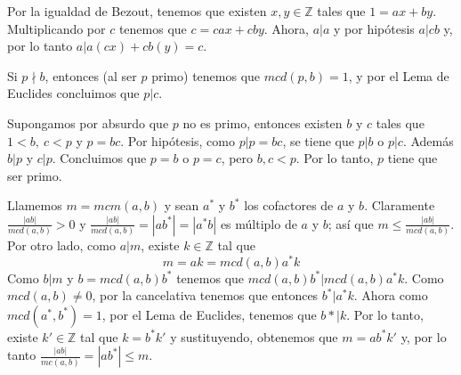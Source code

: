 \documentclass{report}
\begin{document}
\begin{myproof}
	Por la igualdad de Bezout, tenemos que existen $x,y\in\mathbb{Z}$ tales que $1=ax+by$. Multiplicando por $c$ tenemos que $c=cax+cby$. Ahora, $a|a$ y por hipótesis $a|cb$ y, por lo tanto $a|a(cx)+cb(y)=c$.
\end{myproof}
\begin{myproof}
	Si $p\nmid b$, entonces (al ser $p$ primo) tenemos que $mcd(p,b)=1$, y por el Lema de Euclides concluimos que $p|c$.
\end{myproof}
\begin{myproof}
	Supongamos por absurdo que $p$ no es primo, entonces existen $b$ y $c$ tales que $1<b,\ c<p$ y $p=bc$. Por hipótesis, como $p|p=bc$, se tiene que $p|b$ o $p|c$. Además $b|p$ y $c|p$. Concluimos que $p=b$ o $p=c$, pero $b,c<p$. Por lo tanto, $p$ tiene que ser primo.
\end{myproof}
\begin{myproof}
	Llamemos $m=mcm(a,b)$ y sean $a^*$ y $b^*$ los cofactores de $a$ y $b$. Claramente $\frac{|ab|}{mcd(a,b)}>0$ y $\frac{|ab|}{mcd(a,b)}=|ab^*|=|a^*b|$ es múltiplo de $a$ y $b$; así que $m\le \frac{|ab|}{mcd(a,b)}$.\\
	Por otro lado, como $a|m$, existe $k\in\mathbb{Z}$ tal que $$m=ak=mcd(a,b)a^*k$$
	Como $b|m$ y $b=mcd(a,b)b^*$ tenemos que $mcd(a,b)b^*|mcd(a,b)a^*k$. Como $mcd(a,b)\neq 0$, por la cancelativa tenemos que entonces $b^*|a^*k$. Ahora como $mcd(a^*,b^*)=1$, por el Lema de Euclides, tenemos que $b*|k$. Por lo tanto, existe $k'\in\mathbb{Z}$ tal que $k=b^*k'$ y sustituyendo, obtenemos que $m=ab^*k'$ y, por lo tanto $\frac{|ab|}{mc(a,b)}=|ab^*|\le m$.
\end{myproof}
\end{document}
